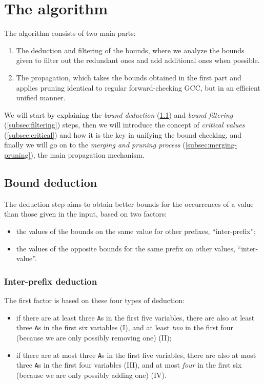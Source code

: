 \documentclass[a4paper,10pt]{article}
\begin{document}
\section{The algorithm}
The algorithm consists of two main parts:
\begin{enumerate}
    \item The deduction and filtering of the bounds, where we analyze the bounds given to filter out the redundant ones and add additional ones when possible.
    \item The propagation, which takes the bounds obtained in the first part and applies pruning identical to regular forward-checking GCC, but in an efficient unified manner.
\end{enumerate}

We will start by explaining the \emph{bound deduction} (\ref{subsec:deduction}) and \emph{bound filtering} (\ref{subsec:filtering}) steps, then we will introduce the concept of \emph{critical values} (\ref{subsec:critical}) and how it is the key in unifying the bound checking, and finally we will go on to the \emph{merging and pruning process} (\ref{subsec:merging-pruning}), the main propagation mechanism.

\subsection{Bound deduction}
\label{subsec:deduction}

The deduction step aims to obtain better bounds for the occurrences of a value than those given in the input, based on two factors:
\begin{itemize}
    \item the values of the bounds on the same value for other prefixes, ``inter-prefix'';
    \item the values of the opposite bounds for the same prefix on other values, ``inter-value''.
\end{itemize}

\subsubsection{Inter-prefix deduction}

The first factor is based on these four types of deduction:
\begin{itemize}
    \item if there are at least three \texttt{A}s in the first five variables, there are also at least three \texttt{A}s in the first six variables (I), and at least \emph{two} in the first four (because we are only possibly removing one) (II);
    \item if there are at most three \texttt{A}s in the first five variables, there are also at most three \texttt{A}s in the first four variables (III), and at most \emph{four} in the first six (because we are only possibly adding one) (IV).
\end{itemize}
\end{document}

